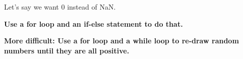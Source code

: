 \documentclass[12pt,a4paper]{scrartcl}\usepackage[]{graphicx}\usepackage[]{color}
\begin{document}
Let's say we want 0 instead of NaN.

\begin{Exercise}[difficulty=2]
\textbf{Use a for loop and an if-else statement to do that.}
\end{Exercise}

\begin{Exercise}[difficulty=3]
\textbf{More difficult: Use a for loop and a while loop to re-draw random numbers until they are all positive.}
\end{Exercise}
\end{document}
